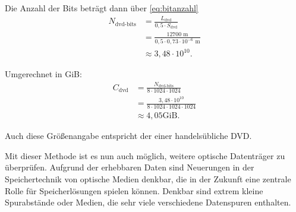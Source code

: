 \documentclass[9pt,twocolumn,twoside]{pnas-new}
\begin{document}
Die Anzahl der Bits beträgt dann über \eqref{eq:bitanzahl}
\begin{align*}
N_{\mbox{dvd-bits}} &=  \frac{L_{\mbox{dvd}}}{0,5\cdot S_{\mbox{dvd}}}\\
&= \frac{12700\mbox{ m}}{0,5\cdot 0,73\cdot10^{-6}\mbox{ m}}\\
&\approx 3,48\cdot 10^{10}.
\end{align*}

Umgerechnet in GiB:
\begin{align*}
C_{\mbox{dvd}} &= \frac{N_{\mbox{dvd-bits}}}{8\cdot1024\cdot1024}\\
&= \frac{3,48\cdot10^{10}}{8\cdot1024\cdot1024\cdot1024}\\
&\approx 4,05\mbox{GiB}.
\end{align*}

Auch diese Größenangabe entspricht der einer handelsübliche DVD.


Mit dieser Methode ist es nun auch möglich, weitere optische Datenträger zu überprüfen.
Aufgrund der erhebbaren Daten sind Neuerungen in der Speichertechnik von optische Medien denkbar, die in der Zukunft eine zentrale Rolle für Speicherlösungen spielen können.
Denkbar sind extrem kleine Spurabstände oder Medien, die sehr viele verschiedene Datenspuren enthalten.




\end{document}
